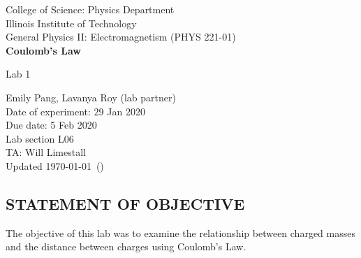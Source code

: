 \documentclass [12pt, letterpaper, twoside]{article}
\begin{document}
\begin{titlepage}
\begin{center}
College of Science: Physics Department \\
\vspace{0.1cm}
Illinois Institute of Technology\\
\vspace{0.1cm}
General Physics II: Electromagnetism (PHYS 221-01)\\
\vspace*{\fill}
\begingroup
\Large
\textbf{Coulomb's Law}
\vspace{0.35cm}

\normalsize
Lab 1
\vspace{1.5cm}
\endgroup
\vspace*{\fill}
\end{center}

\vspace*{\fill}
\begin{flushright}
\footnotesize
Emily Pang, Lavanya Roy (lab partner) \\
Date of experiment: 29 Jan 2020 \\
Due date: 5 Feb 2020 \\
Lab section L06 \\
TA: Will Limestall \\
Updated \usdate\today~(\currenttime)
\end{flushright}
\end{titlepage}

\subsection*{STATEMENT OF OBJECTIVE}
The objective of this lab was to examine the relationship between charged masses and the distance between charges using Coulomb's Law.
\end{document}
